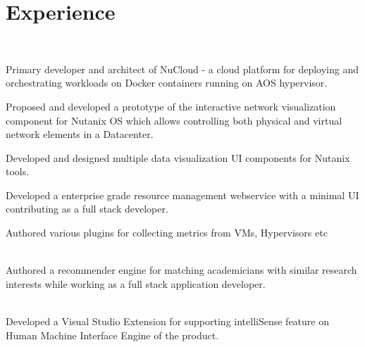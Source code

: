 \documentclass[]{deedy-resume-openfont}
\begin{document}
\begin{minipage}[t]{0.66\textwidth} 
	    
	    
	\section{Experience}
	    
	\\
	\vspace{\topsep} %
	\begin{tightemize}
		\item Primary developer and architect of NuCloud - a cloud platform for deploying and orchestrating workloads on Docker containers running on AOS hypervisor.
		\item Proposed and developed a prototype of the interactive network visualization component for Nutanix OS which allows controlling both physical and virtual network elements in a Datacenter. 
		\item Developed and designed multiple data visualization UI components for Nutanix tools.
	\end{tightemize}
	\begin{tightemize}
		\item Developed a enterprise grade resource management webservice with a minimal UI contributing as a full stack developer.
		\item Authored various plugins for collecting metrics from VMs, Hypervisors etc
	\end{tightemize}
	\sectionsep
	    
	\\
	Authored a recommender engine for matching academicians with similar research interests while working as a full stack application developer.
	\sectionsep
	    
	\\
	Developed a Visual Studio Extension for supporting intelliSense feature on Human Machine Interface Engine of the product.
	\sectionsep
	    
	    

\end{minipage}
\end{document}
